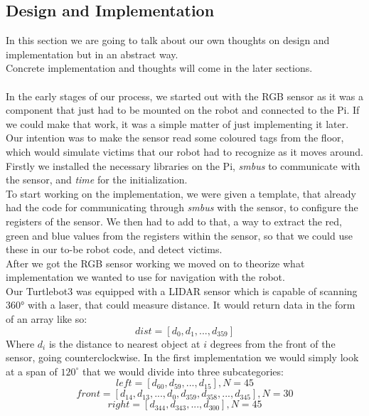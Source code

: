 \documentclass[conference]{IEEEtran}
\begin{document}
\subsection{Design and Implementation}\label{design}
In this section we are going to talk about our own thoughts on design and implementation but in an abstract way.\\
Concrete implementation and thoughts will come in the later sections. \\
\\
In the early stages of our process, we started out with the RGB sensor as it was a component that just had to be mounted 
on the robot and connected to the Pi. If we could make that work, it was a simple matter of just implementing it later.\\
Our intention was to make the sensor read some coloured tags from the floor, which would simulate victims that our robot 
had to recognize as it moves around.\\
Firstly we installed the necessary libraries on the Pi, \textit{smbus} to communicate with the sensor, and \textit{time} for 
the initialization. \\
To start working on the implementation, we were given a template, that already had the code for communicating through 
\textit{smbus} with the sensor, to configure the registers of the sensor. We then had to add to that, a way to extract the red, 
green and blue values from the registers within the sensor, so that we could use these in our to-be robot code, and detect 
victims.\\
After we got the RGB sensor working we moved on to theorize what implementation we wanted to use for navigation with the robot.\\
Our Turtlebot3 was equipped with a LIDAR sensor which is capable of scanning 360° with a laser, that could measure distance. 
It would return data in the form of an array like so:
\[dist = \left[d_0, d_1, ..., d_{359}\right]\]
Where $d_i$ is the distance to nearest object at $i$ degrees from the front of the sensor, going counterclockwise. 
In the first implementation we would simply look at a span of $120^{\circ}$ that we would divide into three subcategories:
\[left = \left[d_{60}, d_{59}, ..., d_{15}\right], N = 45\]
\[front = \left[d_{14}, d_{13}, ..., d_0, d_{359}, d_{358}, ..., d_{345}\right], N = 30\]
\[right = \left[d_{344}, d_{343}, ..., d_{300}\right], N = 45\]
\end{document}
